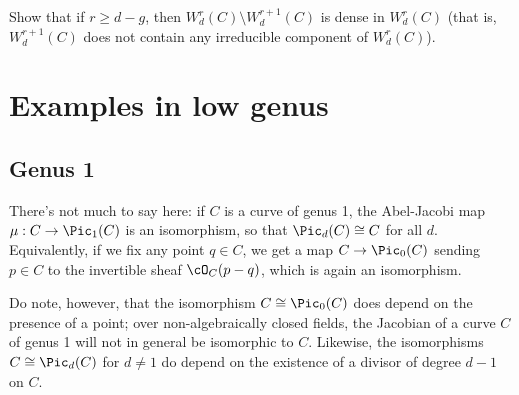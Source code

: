 
\begin{exercise}
Show that if $r \geq d-g$, then $W^r_d(C) \setminus W^{r+1}_d(C)$ is dense in $W^r_d(C)$ (that is, $W^{r+1}_d(C)$ does not contain any irreducible component of $W^r_d(C)$).
\end{exercise}


\section{Examples in low genus}

\subsection{Genus 1} 

There's not much to say here: if $C$ is a curve of genus 1, the Abel-Jacobi map $\mu : C \to \Pic_1(C)$ is an isomorphism, so that $\Pic_d(C) \cong C$ for all $d$. Equivalently, if we fix any point $q \in C$, we get a map $C \to \Pic_0(C)$ sending $p \in C$ to the invertible sheaf $\cO_C(p-q)$, which is again an isomorphism.

Do note, however, that the isomorphism $C \cong \Pic_0(C)$ does depend on the presence of a point; over non-algebraically closed fields, the Jacobian of a curve $C$ of genus 1 will not in general be isomorphic to $C$. Likewise, the isomorphisms $C \cong \Pic_d(C)$
for $d \neq 1$ do depend on the existence of a divisor of degree $d-1$ on $C$.

